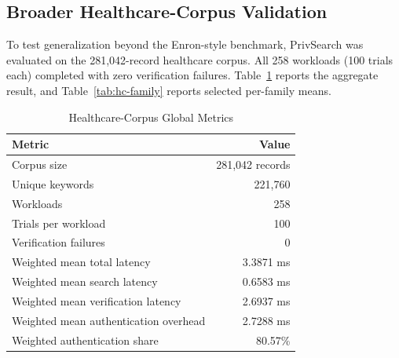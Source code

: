 \subsection{Broader Healthcare-Corpus Validation}
\label{4F}
To test generalization beyond the Enron-style benchmark, PrivSearch was evaluated on the 281{,}042-record healthcare corpus. All 258 workloads (100 trials each) completed with zero verification failures. Table~\ref{tab:hc-global} reports the aggregate result, and Table~\ref{tab:hc-family} reports selected per-family means.
\begin{table}[t]
\centering
\caption{Healthcare-Corpus Global Metrics}
\label{tab:hc-global}
\small
\begin{tabular}{lr}
\toprule
\textbf{Metric} & \textbf{Value} \\
\midrule
Corpus size & 281,042 records \\
Unique keywords & 221,760 \\
Workloads & 258 \\
Trials per workload & 100 \\
Verification failures & 0 \\
Weighted mean total latency & 3.3871 ms \\
Weighted mean search latency & 0.6583 ms \\
Weighted mean verification latency & 2.6937 ms \\
Weighted mean authentication overhead & 2.7288 ms \\
Weighted authentication share & 80.57\% \\
\bottomrule
\end{tabular}
\end{table}
